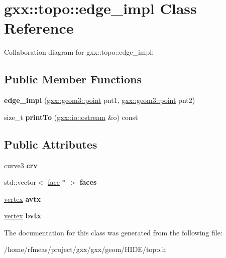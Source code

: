 \hypertarget{classgxx_1_1topo_1_1edge__impl}{}\section{gxx\+:\+:topo\+:\+:edge\+\_\+impl Class Reference}
\label{classgxx_1_1topo_1_1edge__impl}


Collaboration diagram for gxx\+:\+:topo\+:\+:edge\+\_\+impl\+:
\subsection*{Public Member Functions}
\begin{DoxyCompactItemize}
\item 
{\bfseries edge\+\_\+impl} (\hyperlink{classgxx_1_1geom3_1_1point}{gxx\+::geom3\+::point} pnt1, \hyperlink{classgxx_1_1geom3_1_1point}{gxx\+::geom3\+::point} pnt2)\hypertarget{classgxx_1_1topo_1_1edge__impl_a81058d8dcd14cf9e70dfcefcdfa78c27}{}\label{classgxx_1_1topo_1_1edge__impl_a81058d8dcd14cf9e70dfcefcdfa78c27}

\item 
size\+\_\+t {\bfseries print\+To} (\hyperlink{classgxx_1_1io_1_1ostream}{gxx\+::io\+::ostream} \&o) const \hypertarget{classgxx_1_1topo_1_1edge__impl_af4526f6edd804684fa5a607cbfb6ee29}{}\label{classgxx_1_1topo_1_1edge__impl_af4526f6edd804684fa5a607cbfb6ee29}

\end{DoxyCompactItemize}
\subsection*{Public Attributes}
\begin{DoxyCompactItemize}
\item 
curve3 {\bfseries crv}\hypertarget{classgxx_1_1topo_1_1edge__impl_a3139cd8b8c51a4059f6b3899820e4ff0}{}\label{classgxx_1_1topo_1_1edge__impl_a3139cd8b8c51a4059f6b3899820e4ff0}

\item 
std\+::vector$<$ \hyperlink{classgxx_1_1topo_1_1face}{face} $\ast$ $>$ {\bfseries faces}\hypertarget{classgxx_1_1topo_1_1edge__impl_acf964295b6c575f836c8296143c56813}{}\label{classgxx_1_1topo_1_1edge__impl_acf964295b6c575f836c8296143c56813}

\item 
\hyperlink{classgxx_1_1topo_1_1vertex}{vertex} {\bfseries avtx}\hypertarget{classgxx_1_1topo_1_1edge__impl_ac7baadb7e2a14d451c45a38f78180be0}{}\label{classgxx_1_1topo_1_1edge__impl_ac7baadb7e2a14d451c45a38f78180be0}

\item 
\hyperlink{classgxx_1_1topo_1_1vertex}{vertex} {\bfseries bvtx}\hypertarget{classgxx_1_1topo_1_1edge__impl_aa3ad18feb795dc9574dd494271c74df1}{}\label{classgxx_1_1topo_1_1edge__impl_aa3ad18feb795dc9574dd494271c74df1}

\end{DoxyCompactItemize}


The documentation for this class was generated from the following file\+:\begin{DoxyCompactItemize}
\item 
/home/rfmeas/project/gxx/gxx/geom/\+H\+I\+D\+E/topo.\+h\end{DoxyCompactItemize}
